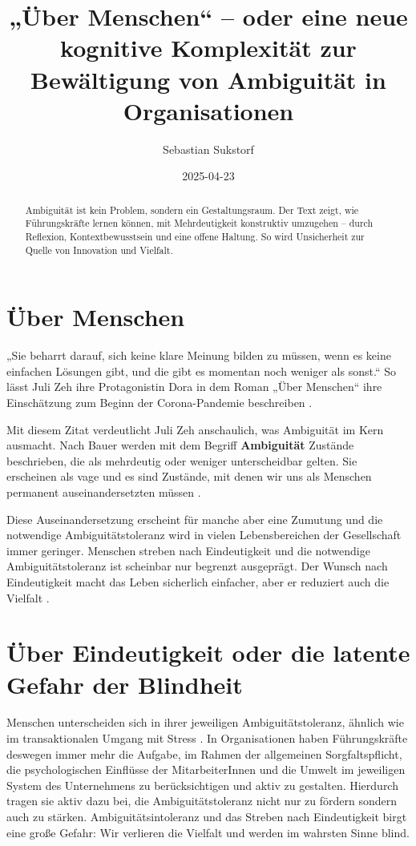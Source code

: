 \documentclass[
  ngerman,
  letterpaper,
  DIV=11]{scrartcl}
\title{„Über Menschen`` -- oder eine neue kognitive Komplexität zur
Bewältigung von Ambiguität in Organisationen}
\author{Sebastian Sukstorf}
\date{2025-04-23}
\renewcommand*\contentsname{Inhaltsverzeichnis}
\newcommand\contentsname{Inhaltsverzeichnis}
\begin{document}
\maketitle
\begin{abstract}
Ambiguität ist kein Problem, sondern ein Gestaltungsraum. Der Text
zeigt, wie Führungskräfte lernen können, mit Mehrdeutigkeit konstruktiv
umzugehen -- durch Reflexion, Kontextbewusstsein und eine offene
Haltung. So wird Unsicherheit zur Quelle von Innovation und Vielfalt.
\end{abstract}

\renewcommand*\contentsname{Inhaltsverzeichnis}
{
\hypersetup{linkcolor=}
\setcounter{tocdepth}{3}
\tableofcontents
}

\section{Über Menschen}\label{uxfcber-menschen}

„Sie beharrt darauf, sich keine klare Meinung bilden zu müssen, wenn es
keine einfachen Lösungen gibt, und die gibt es momentan noch weniger als
sonst.`` So lässt Juli Zeh ihre Protagonistin Dora in dem Roman „Über
Menschen`` ihre Einschätzung zum Beginn der Corona-Pandemie beschreiben
\autocite[28.]{zeh2022}.

Mit diesem Zitat verdeutlicht Juli Zeh anschaulich, was Ambiguität im
Kern ausmacht. Nach Bauer werden mit dem Begriff \textbf{Ambiguität}
Zustände beschrieben, die als mehrdeutig oder weniger unterscheidbar
gelten. Sie erscheinen als vage und es sind Zustände, mit denen wir uns
als Menschen permanent auseinandersetzten müssen
\autocite[13]{bauer2018}.

Diese Auseinandersetzung erscheint für manche aber eine Zumutung und die
notwendige Ambiguitätstoleranz wird in vielen Lebensbereichen der
Gesellschaft immer geringer. Menschen streben nach Eindeutigkeit und die
notwendige Ambiguitätstoleranz ist scheinbar nur begrenzt ausgeprägt.
Der Wunsch nach Eindeutigkeit macht das Leben sicherlich einfacher, aber
er reduziert auch die Vielfalt \autocite{bauer2018}.

\section{Über Eindeutigkeit oder die latente Gefahr der
Blindheit}\label{uxfcber-eindeutigkeit-oder-die-latente-gefahr-der-blindheit}

Menschen unterscheiden sich in ihrer jeweiligen Ambiguitätstoleranz,
ähnlich wie im transaktionalen Umgang mit Stress \autocite{lazarus1984}.
In Organisationen haben Führungskräfte deswegen immer mehr die Aufgabe,
im Rahmen der allgemeinen Sorgfaltspflicht, die psychologischen
Einflüsse der MitarbeiterInnen und die Umwelt im jeweiligen System des
Unternehmens zu berücksichtigen und aktiv zu gestalten. Hierdurch tragen
sie aktiv dazu bei, die Ambiguitätstoleranz nicht nur zu fördern sondern
auch zu stärken. Ambiguitätsintoleranz und das Streben nach
Eindeutigkeit birgt eine große Gefahr: Wir verlieren die Vielfalt und
werden im wahrsten Sinne blind.
\end{document}
